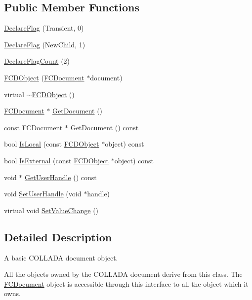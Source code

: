 \subsection*{Public Member Functions}
\begin{DoxyCompactItemize}
\item 
\hyperlink{classFCDObject_aca79d8d610d29be4d162e674ccb006f5}{DeclareFlag} (Transient, 0)
\item 
\hyperlink{classFCDObject_a86effe001056e7eb435a76852706857f}{DeclareFlag} (NewChild, 1)
\item 
\hyperlink{classFCDObject_a829bea1d332894b2f803754b8832a818}{DeclareFlagCount} (2)
\item 
\hyperlink{classFCDObject_abb787f16c30ad2788684869045a99dd6}{FCDObject} (\hyperlink{classFCDocument}{FCDocument} $\ast$document)
\item 
virtual \hyperlink{classFCDObject_afbb15500235ce725aa634128406fcd9d}{$\sim$FCDObject} ()
\item 
\hyperlink{classFCDocument}{FCDocument} $\ast$ \hyperlink{classFCDObject_a6c8a748e2691d69586ab87b46b01e072}{GetDocument} ()
\item 
const \hyperlink{classFCDocument}{FCDocument} $\ast$ \hyperlink{classFCDObject_aa2ff1f1ca238df9dfa5c633ae2e27dc1}{GetDocument} () const 
\item 
bool \hyperlink{classFCDObject_a00962a83267c742d2d5c37dba993c57b}{IsLocal} (const \hyperlink{classFCDObject}{FCDObject} $\ast$object) const 
\item 
bool \hyperlink{classFCDObject_a80b3ead3bd7925339fc704819b5a8cdf}{IsExternal} (const \hyperlink{classFCDObject}{FCDObject} $\ast$object) const 
\item 
void $\ast$ \hyperlink{classFCDObject_ab77b02a9672a50cfe041bac026a26ea7}{GetUserHandle} () const 
\item 
void \hyperlink{classFCDObject_a32714d741f0673992de087516a79b9e7}{SetUserHandle} (void $\ast$handle)
\item 
virtual void \hyperlink{classFCDObject_a26513baaf8b9a2996f9c050e4a7c16d8}{SetValueChange} ()
\end{DoxyCompactItemize}


\subsection{Detailed Description}
A basic COLLADA document object.

All the objects owned by the COLLADA document derive from this class. The \hyperlink{classFCDocument}{FCDocument} object is accessible through this interface to all the object which it owns.

